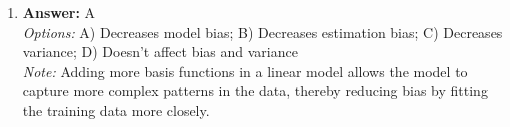 \documentclass[12pt]{article}
\begin{document}
\begin{enumerate}[label=\arabic*.]
\\ \textit{Note:} The correct answer is based on the structure of the Bayesian network, where the joint probability distribution can be factored according to the conditional dependencies represented by the arrows, leading to the expression P(X, Y, Z) = P(Y) * P(X|Y) * P(Z|Y).
\item \textbf{Answer:} A
\\ \textit{Options:} A) Decreases model bias; B) Decreases estimation bias; C) Decreases variance; D) Doesn't affect bias and variance
\\ \textit{Note:} Adding more basis functions in a linear model allows the model to capture more complex patterns in the data, thereby reducing bias by fitting the training data more closely.
\end{enumerate}
\end{document}
